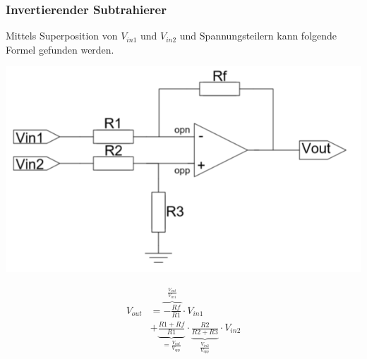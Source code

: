 \subsubsection{Invertierender Subtrahierer}
Mittels Superposition von $V_{in1}$ und $V_{in2}$ und Spannungsteilern kann folgende Formel gefunden werden.\\
\begin{minipage}{0.20\textwidth}
	\includegraphics[width=\linewidth,keepaspectratio=true]{./Images/opamp_invertierend_subtrahierer}
\end{minipage}%
\begin{minipage}{0.30\textwidth}
	\begin{align*}
		V_{out} &= \overbrace{-\frac{Rf}{R1}}^{\frac{V_{out}}{V_{in1}}}\cdot V_{in1} \\ &+ \underbrace{\frac{R1 + Rf}{R1}}_{= \frac{V_{out}}{V_{opp}}} \cdot \underbrace{\frac{R2}{R2 + R3}}_{\frac{V_{in2}}{V_{opp}}} \cdot V_{in2}
	\end{align*}
\end{minipage}

